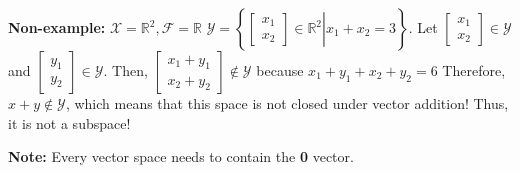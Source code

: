 \documentclass[letterpaper]{article}
\newcommand{\real}{\mathbb R}  %
\begin{document}
\noindent \textbf{Non-example: } $\mathcal{X} = \real^2, \mathcal{F} = \real$
    \newline
    $\mathcal{Y} = \left\{\left.\begin{bmatrix}x_1 \\ x_2 \end{bmatrix} \in \real^2\right|x_1 + x_2 = 3 \right\}$.
    \newline
    Let $\begin{bmatrix} x_1 \\ x_2 \end{bmatrix}\in\mathcal{Y}$ and $\begin{bmatrix} y_1 \\ y_2 \end{bmatrix}\in\mathcal{Y}$. Then, $\begin{bmatrix}  x_1 + y_1 \\ x_2 + y_2 \end{bmatrix}\notin\mathcal{Y}$ because $x_1 + y_1 + x_2 + y_2 = 6$
    \newline
    Therefore, $x + y \not\in \mathcal{Y}$, which means that this space is not closed under vector addition! Thus, it is not a subspace!

\noindent \textbf{Note: } Every vector space needs to contain the \textbf{0} vector.
\end{document}
